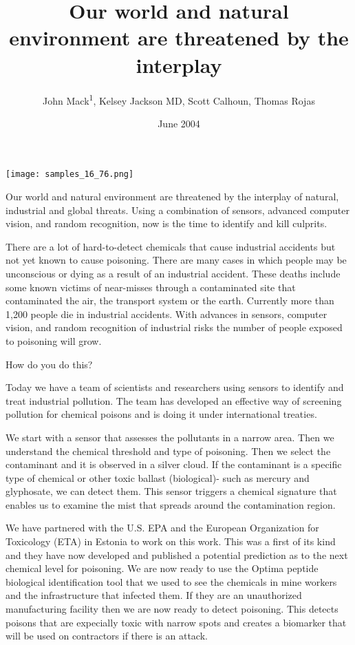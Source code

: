 \documentclass{article}
\title{Our world and natural environment are threatened by the interplay}
\author{John Mack\textsuperscript{1},  Kelsey Jackson MD,  Scott Calhoun,  Thomas Rojas}
\affil{\textsuperscript{1}Saint Joseph University, Lebanon}
\date{June 2004}
\begin{document}
\maketitle

\begin{center}
\begin{minipage}{0.75\linewidth}
\texttt{[image: samples\_16\_76.png]}
\end{minipage}
\end{center}

Our world and natural environment are threatened by the interplay of natural, industrial and global threats. Using a combination of sensors, advanced computer vision, and random recognition, now is the time to identify and kill culprits.

There are a lot of hard-to-detect chemicals that cause industrial accidents but not yet known to cause poisoning. There are many cases in which people may be unconscious or dying as a result of an industrial accident. These deaths include some known victims of near-misses through a contaminated site that contaminated the air, the transport system or the earth. Currently more than 1,200 people die in industrial accidents. With advances in sensors, computer vision, and random recognition of industrial risks the number of people exposed to poisoning will grow.

How do you do this?

Today we have a team of scientists and researchers using sensors to identify and treat industrial pollution. The team has developed an effective way of screening pollution for chemical poisons and is doing it under international treaties.

We start with a sensor that assesses the pollutants in a narrow area. Then we understand the chemical threshold and type of poisoning. Then we select the contaminant and it is observed in a silver cloud. If the contaminant is a specific type of chemical or other toxic ballast (biological)- such as mercury and glyphosate, we can detect them. This sensor triggers a chemical signature that enables us to examine the mist that spreads around the contamination region.

We have partnered with the U.S. EPA and the European Organization for Toxicology (ETA) in Estonia to work on this work. This was a first of its kind and they have now developed and published a potential prediction as to the next chemical level for poisoning. We are now ready to use the Optima peptide biological identification tool that we used to see the chemicals in mine workers and the infrastructure that infected them. If they are an unauthorized manufacturing facility then we are now ready to detect poisoning. This detects poisons that are expecially toxic with narrow spots and creates a biomarker that will be used on contractors if there is an attack.
\end{document}
